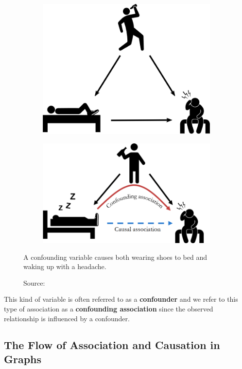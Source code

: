 \begin{figure}[h]
    \centering
    \begin{subfigure}{.5\textwidth}
      \centering
      \includegraphics[width=.65\linewidth]{figures/ch3/9.conf.png}
    \end{subfigure}%
    \begin{subfigure}{.5\textwidth}
      \centering
      \includegraphics[width=.75\linewidth]{figures/ch3/10.confcol.png}
    \end{subfigure}
    \caption{A confounding variable causes both wearing shoes to bed and waking up with a headache.}
    \vspace{-10px}
    \caption*{\scriptsize{Source: \cite{Neal_2020a}}}
    \label{fig:confounding}
\end{figure}

This kind of variable is often referred to as a \textbf{confounder} and
we refer to this type of association as a \textbf{confounding association}
since the observed relationship is influenced by a confounder.


\subsection{The Flow of Association and Causation in Graphs}
\label{sec:flow}

